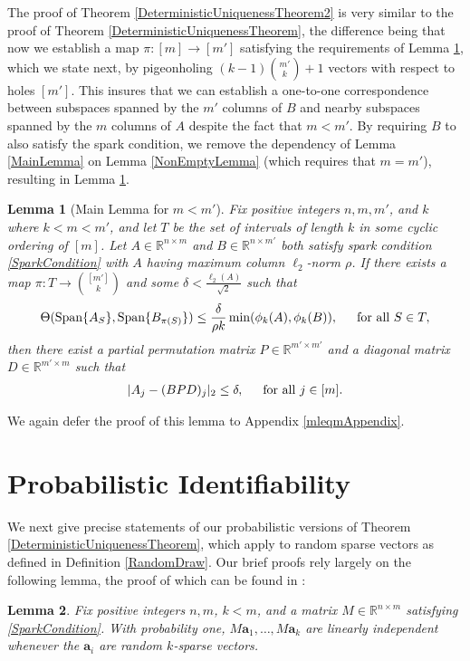\documentclass[journal, onecolumn]{IEEEtran}
\newtheorem{lemma}{Lemma}
\begin{document}
The proof of Theorem \ref{DeterministicUniquenessTheorem2} is very similar to the proof of Theorem \ref{DeterministicUniquenessTheorem}, the difference being that now we establish a map $\pi: [m] \to [m']$ satisfying the requirements of Lemma \ref{MainLemma2}, which we state next, by pigeonholing $(k-1){m' \choose k} + 1$ vectors with respect to holes $[m']$. This insures that we can establish a one-to-one correspondence between subspaces spanned by the $m'$ columns of $B$ and nearby subspaces spanned by the $m$ columns of $A$ despite the fact that $m < m'$. By requiring $B$ to also satisfy the spark condition, we remove the dependency of Lemma \ref{MainLemma} on Lemma \ref{NonEmptyLemma} (which requires that $m = m'$), resulting in Lemma \ref{MainLemma2}.

\begin{lemma}[Main Lemma for $m < m'$]\label{MainLemma2}
Fix positive integers $n, m, m'$, and $k$ where $k < m < m'$, and let $T$ be the set of intervals of length $k$ in some cyclic ordering of $[m]$. Let $A \in \mathbb{R}^{n \times m}$ and $B \in \mathbb{R}^{n \times m'}$ both satisfy spark condition \eqref{SparkCondition} with $A$ having maximum column $\ell_2$-norm $\rho$. If there exists a map $\pi: T \to {[m'] \choose k}$ and some $\delta < \frac{\ell_{2}(A)}{\sqrt{2}}$ such that 
\begin{equation}\label{GapUpperBound2}
\Theta(\text{\rm Span}\{A_{S}\}, \text{\rm Span}\{B_{\pi(S)}\}) \leq \frac{ \delta }{\rho k} \min(\phi_k(A), \phi_k(B)), \indent \text{for all } S \in T,
\end{equation}
%
then there exist a partial permutation matrix $P \in \mathbb{R}^{m' \times m'}$ and a diagonal matrix $D \in \mathbb{R}^{m' \times m}$ such that
\begin{align}
|A_j - (BPD)_j|_2 \leq \delta, \indent \text{for all } j \in [m].
\end{align}
\end{lemma}

We again defer the proof of this lemma to Appendix \ref{mleqmAppendix}.



\section{Probabilistic Identifiability}\label{PUT}

We next give precise statements of our probabilistic versions of Theorem \ref{DeterministicUniquenessTheorem}, which apply to random sparse vectors as defined in Definition \ref{RandomDraw}. Our brief proofs rely largely on the following lemma, the proof of which can be found in \cite[Lemma 3]{Hillar15}:
\begin{lemma}\label{Hillar15lemma2}
Fix positive integers $n, m$, $k < m$, and a matrix $M \in \mathbb{R}^{n \times m}$ satisfying \eqref{SparkCondition}. With probability one, $M\mathbf{a}_1, \ldots, M\mathbf{a}_k$ are linearly independent whenever the $\mathbf{a}_i$ are random $k$-sparse vectors.
\end{lemma}
\end{document}
